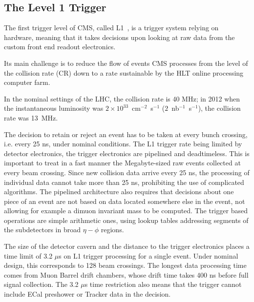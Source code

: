 \subsection{The Level 1 Trigger}



The first trigger level of CMS, called L1~\cite{Dasu:2000ge}, is a
trigger system relying on hardware, meaning that it takes decisions
upon looking at raw data from the custom front end readout electronics.%

Its main challenge is to reduce the flow of events CMS
processes from the level of the collision rate (CR) down to a rate
sustainable by the HLT online processing computer farm. 

In the nominal settings of the LHC, the collision rate is 40 MHz; in 2012 when the instantaneous luminosity was
$2\times10^{33}$~cm$^{-2}$~s$^{-1}$ ($2$~nb$^{-1}$~s$^{-1}$), the collision rate was 13~MHz.

The decision to retain or reject an event has to be taken at every
bunch crossing, i.e. every 25 ns, under nominal conditions. The L1
trigger rate being limited by detector electronics, the trigger electronics are pipelined and
deadtimeless. This is important to treat in a
fast manner the Megabyte-sized raw events collected at every beam
crossing. Since new collision data arrive every 25 ns, the
processing of individual data cannot take more than 25 ns,
prohibiting the use of complicated algorithms. The pipelined architecture also requires that decisions
about one piece of an event are not based on data located somewhere
else in the event, not allowing for example a dimuon invariant mass to
be computed. The trigger based operations are simple arithmetic ones,
using lookup tables addressing segments of the subdetectors in broad
$\eta-\phi$ regions.

The size of the detector cavern and the distance to the trigger electronics
places a time limit of 3.2 $\mu$s on L1 trigger processing for a
single event. Under nominal design, this corresponds to 128 beam
crossings. The longest data processing time comes from Muon Barrel
drift chambers, whose drift time takes 400 ns before full signal
collection. The 3.2 $\mu$s time restriction also means that the
trigger cannot include ECal preshower or Tracker data in the decision.

